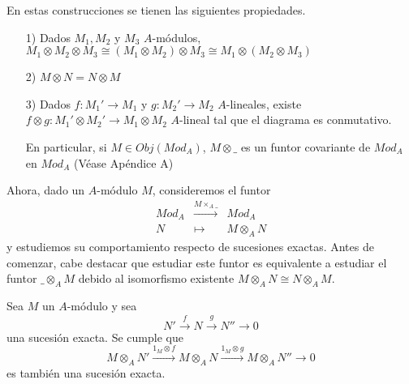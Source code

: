 \documentclass[../main.tex]{subfiles}
\begin{document}
En estas construcciones se tienen las siguientes propiedades.
\begin{itemize}
	\item [1)] Dados $M_1,M_2$ y $M_3$ $A$-módulos, $M_1\otimes  M_2\otimes M_3\cong(M_1\otimes  M_2)\otimes  M_3\cong M_1\otimes (M_2\otimes  M_3)$
	\item [2)] $M\otimes N=N\otimes M$
	\item [3)] Dados $f:M_1'\to M_1$ y $g:M_2'\to M_2$ $A$-lineales, existe $f\otimes g:M_1'\otimes  M_2'\rightarrow M_1\otimes M_2$ $A$-lineal tal que el diagrama es conmutativo.
	
	En particular, si $M\in Obj(Mod_A)$, $M\otimes\_$ es un funtor covariante de $Mod_A$ en $Mod_A$ (Véase Apéndice A)
\end{itemize}

Ahora, dado un $A$-módulo $M$, consideremos el funtor
$$\begin{array}{rcl}
Mod_A&\overset{M\times_A\_}{\longrightarrow}&Mod_A\\
N&\longmapsto&M\otimes_A N
\end{array}$$
y estudiemos su comportamiento respecto de sucesiones exactas. Antes de comenzar, cabe destacar que estudiar este funtor es equivalente a estudiar el funtor $\_\otimes_A M$ debido al isomorfismo existente $M\otimes_A N\cong N\otimes_A M$.

\begin{proposition}
	Sea $M$ un $A$-módulo y sea \begin{equation}\label{equation: ext1}
	N'\overset{f}{\longrightarrow}N\overset{g}{\longrightarrow}N''\longrightarrow 0
	\end{equation}una sucesión exacta. Se cumple que \begin{equation}\label{equation: ext2}
	M\otimes_A N'\overset{1_M\otimes f}{\longrightarrow}M\otimes_A N\overset{1_M\otimes g}{\longrightarrow}M\otimes_A N''\longrightarrow 0
	\end{equation} es también una sucesión exacta.
\end{proposition}
\end{document}
